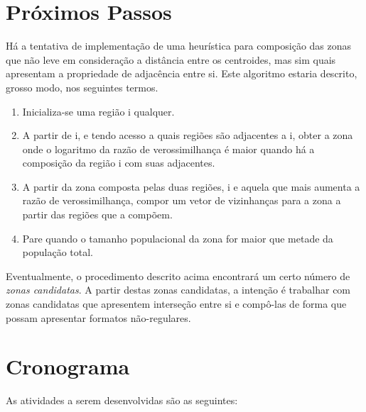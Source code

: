 \documentclass[
	12pt,				%
	openright,			%
	twoside,			%
	a4paper,			%
	english,			%
	brazil,				%
	]{abntex2}
\begin{document}
\chapter{Próximos Passos}
\label{chap:posterior}

Há a tentativa de implementação de uma heurística para composição das zonas que não leve em consideração a distância entre os centroides, mas sim quais apresentam a propriedade de adjacência entre si. Este algoritmo estaria descrito, grosso modo, nos seguintes termos.

\begin{enumerate}
\item Inicializa-se uma região i qualquer.
\item A partir de i, e tendo acesso a quais regiões são adjacentes a i, obter a zona onde o logaritmo da razão de verossimilhança é maior quando há a composição da região i com suas adjacentes.
\item A partir da zona composta pelas duas regiões, i e aquela que mais aumenta a razão de verossimilhança, compor um vetor de vizinhanças para a zona a partir das regiões que a compõem.
\item Pare quando o tamanho populacional da zona for maior que metade da população total.
\end{enumerate}

Eventualmente, o procedimento descrito acima encontrará um certo número de \textit{zonas candidatas}. A partir destas zonas candidatas, a intenção é trabalhar com zonas candidatas que apresentem interseção entre si e compô-las de forma que possam apresentar formatos não-regulares.

\chapter{Cronograma}
\label{chap:crono}

As atividades a serem desenvolvidas são as seguintes:
\end{document}
